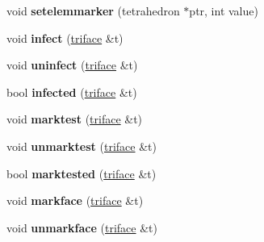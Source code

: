 \begin{DoxyCompactItemize}
\item 
\hypertarget{classtetgenmesh_acb8c694d2d20e494b14b9c9f520cd5c8}{void {\bfseries setelemmarker} (tetrahedron $\ast$ptr, int value)}\label{classtetgenmesh_acb8c694d2d20e494b14b9c9f520cd5c8}

\item 
\hypertarget{classtetgenmesh_ad060b1bbcd6b0ce11367b1a4d1be9c75}{void {\bfseries infect} (\hyperlink{classtetgenmesh_1_1triface}{triface} \&t)}\label{classtetgenmesh_ad060b1bbcd6b0ce11367b1a4d1be9c75}

\item 
\hypertarget{classtetgenmesh_a3de3aa0353d41c28437b3a77cc9618f8}{void {\bfseries uninfect} (\hyperlink{classtetgenmesh_1_1triface}{triface} \&t)}\label{classtetgenmesh_a3de3aa0353d41c28437b3a77cc9618f8}

\item 
\hypertarget{classtetgenmesh_a26ecd46a8e767042b2bd0a2725ac4a89}{bool {\bfseries infected} (\hyperlink{classtetgenmesh_1_1triface}{triface} \&t)}\label{classtetgenmesh_a26ecd46a8e767042b2bd0a2725ac4a89}

\item 
\hypertarget{classtetgenmesh_a4bf3c95209d98d077cf1d9f23940e897}{void {\bfseries marktest} (\hyperlink{classtetgenmesh_1_1triface}{triface} \&t)}\label{classtetgenmesh_a4bf3c95209d98d077cf1d9f23940e897}

\item 
\hypertarget{classtetgenmesh_ad71dabbbfe63203a68adfe3243e2ce05}{void {\bfseries unmarktest} (\hyperlink{classtetgenmesh_1_1triface}{triface} \&t)}\label{classtetgenmesh_ad71dabbbfe63203a68adfe3243e2ce05}

\item 
\hypertarget{classtetgenmesh_a41b5cf3c9d9eec904982f85cf5651f9a}{bool {\bfseries marktested} (\hyperlink{classtetgenmesh_1_1triface}{triface} \&t)}\label{classtetgenmesh_a41b5cf3c9d9eec904982f85cf5651f9a}

\item 
\hypertarget{classtetgenmesh_aeeb480b609c1913bf2d45cc889a54c7d}{void {\bfseries markface} (\hyperlink{classtetgenmesh_1_1triface}{triface} \&t)}\label{classtetgenmesh_aeeb480b609c1913bf2d45cc889a54c7d}

\item 
\hypertarget{classtetgenmesh_abe7f9ab91e674a04397d8d050a7e7eb6}{void {\bfseries unmarkface} (\hyperlink{classtetgenmesh_1_1triface}{triface} \&t)}\label{classtetgenmesh_abe7f9ab91e674a04397d8d050a7e7eb6}


\end{DoxyCompactItemize}
